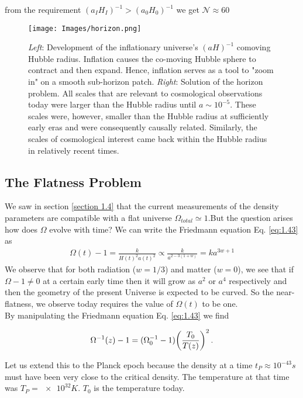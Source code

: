 from the requirement  $(a_I H_I)^{-1} > (a_0 H_0)^{-1}$ we get $\mathcal{N} \approx 60 $
\begin{figure}[ht]
    \centering
    \texttt{[image: Images/horizon.png]}
    \caption{\emph{Left}: Development of the inflationary universe's $(aH)^{-1}$ comoving Hubble radius. Inflation causes the co-moving Hubble sphere to contract and then expand. Hence, inflation serves as a tool to "zoom in" on a smooth sub-horizon patch. \emph{Right}: Solution of the horizon problem. All scales that are relevant to cosmological observations today were larger than the Hubble radius until $a \sim 10^{-5}$. These scales were, however, smaller than the Hubble radius at sufficiently early eras and were consequently causally related. Similarly, the scales of cosmological interest came back within the Hubble radius in relatively recent times.\cite{baumann2012tasi}}
    \label{fig:1.1} 
\end{figure}

\subsection{The Flatness Problem}
We saw in section \ref{section 1.4} that the current measurements of the density parameters are compatible with a flat universe $\Omega_{total} \simeq 1 $.But the question arises how does $\Omega $ evolve with time?
We can write the Friedmann equation Eq. \eqref{eq:1.43} as 
\begin{align}
    \Omega(t)-1 = \frac{k}{H(t)^{2} a(t)^{2}} \propto  \frac{k}{a^{2-3(1+w)}} = ka^{3w+1} \label{1.2.2}
\end{align}
We observe that for both radiation ($w = 1/3$) and matter ($w = 0$), we see that if $\Omega - 1 \neq 0$ at a certain early time then it will grow as $a^2$ or 
$a^4$ respectively and then the geometry of the present Universe is expected to be curved. So the near-flatness, we observe today requires the value of $\Omega(t)$ to be one. \\
By manipulating the Friedmann equation Eq. \eqref{eq:1.43} we find

\begin{align}
  \Omega ^{-1} (z) -1
  = (\Omega_0 ^{-1} -1)\qty(\frac{T_0 }{T(z)})^{2} \,.
\end{align}

Let us extend this to the Planck epoch because the density at a time $t_P \approx 10^{-43}s$ must have been very close to the critical density. The temperature at that time was $T_P = \num{e32} K $. $T_{0}$ is the temperature today.


